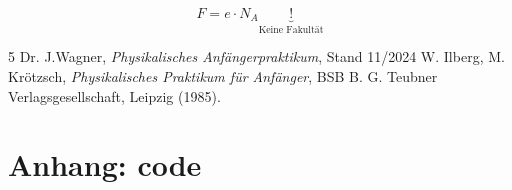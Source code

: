 \documentclass[12pt,a4paper,titlepage]{scrartcl}
\numberwithin{equation}{section}
\numberwithin{table}{section}
\numberwithin{figure}{section}
\begin{document}
 \begin{equation}
     F = e \cdot N_A \underbrace{!}_{\text{Keine Fakultät}}
 \end{equation}



\clearpage

\listoffigures


\listoftables


\begin{thebibliography}{5}
     Dr. J.Wagner, \emph{Physikalisches Anfängerpraktikum}, Stand 11/2024
     W. Ilberg, M. Krötzsch, \emph{Physikalisches Praktikum für Anfänger}, BSB B. G. Teubner Verlagsgesellschaft, Leipzig (1985).
\end{thebibliography}


\appendix

\section{Anhang: code}


\end{document}
